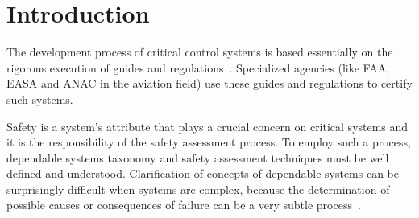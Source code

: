 \documentclass[12pt,openright,twoside,a4paper,oldfontcommands,english,brazil,draft]{abntex2}
\theoremstyle{theo}
\begin{document}
\tableofcontents*
\acresetall
\cleardoublepage

\textual

\chapter{Introduction}
\label{chap:intro}


The development process of critical control systems is based essentially on the rigorous execution of guides and regulations~\cite{ANAC2011,FAA1993,FAA2007,SAE1996b}.
Specialized agencies (like FAA, EASA and ANAC in the aviation field) use these guides and regulations to certify such systems.

Safety is a system's attribute that plays a crucial concern on critical systems and it is the responsibility of the safety assessment process.
To employ such a process, dependable systems taxonomy and safety assessment techniques must be well defined and understood.
Clarification of concepts of dependable systems can be surprisingly difficult when systems are complex, because the determination of possible causes or consequences of failure can be a very subtle process~\cite{ALR+2004}.
\end{document}
